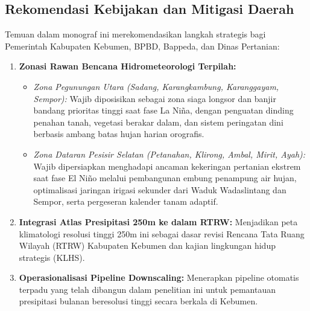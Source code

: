 \documentclass[11pt,a4paper,titlepage]{article}
\begin{document}
\subsection{Rekomendasi Kebijakan dan Mitigasi Daerah}
Temuan dalam monograf ini merekomendasikan langkah strategis bagi Pemerintah Kabupaten Kebumen, BPBD, Bappeda, dan Dinas Pertanian:
\begin{enumerate}
    \item \textbf{Zonasi Rawan Bencana Hidrometeorologi Terpilah:}
    \begin{itemize}
        \item \textit{Zona Pegunungan Utara (Sadang, Karangkambung, Karanggayam, Sempor):} Wajib diposisikan sebagai zona siaga longsor dan banjir bandang prioritas tinggi saat fase La Niña, dengan penguatan dinding penahan tanah, vegetasi berakar dalam, dan sistem peringatan dini berbasis ambang batas hujan harian orografis.
        \item \textit{Zona Dataran Pesisir Selatan (Petanahan, Klirong, Ambal, Mirit, Ayah):} Wajib dipersiapkan menghadapi ancaman kekeringan pertanian ekstrem saat fase El Niño melalui pembangunan embung penampung air hujan, optimalisasi jaringan irigasi sekunder dari Waduk Wadaslintang dan Sempor, serta pergeseran kalender tanam adaptif.
    \end{itemize}
    \item \textbf{Integrasi Atlas Presipitasi 250m ke dalam RTRW:} Menjadikan peta klimatologi resolusi tinggi 250m ini sebagai dasar revisi Rencana Tata Ruang Wilayah (RTRW) Kabupaten Kebumen dan kajian lingkungan hidup strategis (KLHS).
    \item \textbf{Operasionalisasi Pipeline Downscaling:} Menerapkan pipeline otomatis terpadu yang telah dibangun dalam penelitian ini untuk pemantauan presipitasi bulanan beresolusi tinggi secara berkala di Kebumen.
\end{enumerate}
\end{document}
